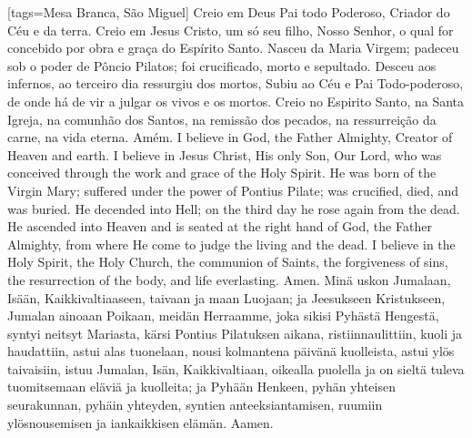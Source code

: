 {\begin{songs}{}
    [tags={Mesa Branca, São Miguel}]
      \baselineadj=0pt\relax%
      \beginverse
        Creio em Deus Pai todo Poderoso,
        Criador do Céu e da terra.
        \parspace
        Creio em Jesus Cristo, um só seu filho, Nosso
        Senhor, o qual for concebido por obra e graça do
        Espírito Santo. Nasceu da Maria Virgem;
        padeceu sob o poder de Pôncio Pilatos;
        foi crucificado, morto e sepultado. Desceu aos
        infernos, ao terceiro dia ressurgiu dos mortos,
        Subiu ao Céu e Pai Todo-poderoso, de onde há de vir
        a julgar os vivos e os mortos.
        \parspace
        Creio no Espirito Santo, na Santa Igreja,
        na comunhão dos Santos, na remissão
        dos pecados, na ressurreição da carne,
        na vida eterna.
        \parspace
        Amém.
      \endverse
      \beginverse\color{englishcolor}
        I believe in God, the Father Almighty,
        Creator of Heaven and earth.
        \parspace
        I believe in Jesus Christ, His only Son, Our Lord,
        who was conceived through the work and grace of
        the Holy Spirit. He was born of the Virgin Mary;
        suffered under the power of Pontius Pilate;
        was crucified, died, and was buried. He decended
        into Hell; on the third day he rose again from
        the dead. He ascended into Heaven and is seated
        at the right hand of God, the Father Almighty, from
        where He come to judge the living and the dead.
        \parspace
        I believe in the Holy Spirit, the Holy Church,
        the communion of Saints, the forgiveness of sins,
        the resurrection of the body, and life everlasting.
        \parspace
        Amen.
      \endverse
      \beginverse\color{finnishcolor}
        Minä uskon Jumalaan, Isään, Kaikkivaltiaaseen,
        taivaan ja maan Luojaan;
        \parspace
        ja Jeesukseen Kristukseen, Jumalan ainoaan Poikaan,
        meidän Herraamme, joka sikisi Pyhästä Hengestä,
        syntyi neitsyt Mariasta, kärsi Pontius Pilatuksen
        aikana, ristiinnaulittiin, kuoli ja haudattiin,
        astui alas tuonelaan, nousi kolmantena päivänä
        kuolleista, astui ylös taivaisiin, istuu Jumalan,
        Isän, Kaikkivaltiaan, oikealla puolella ja on sieltä
        tuleva tuomitsemaan eläviä ja kuolleita;
        \parspace
        ja Pyhään Henkeen, pyhän yhteisen seurakunnan,
        pyhäin yhteyden, syntien anteeksiantamisen,
        ruumiin ylösnousemisen ja iankaikkisen elämän.
        \parspace
        Aamen.
      \endverse
    \endsong



\end{songs}}
